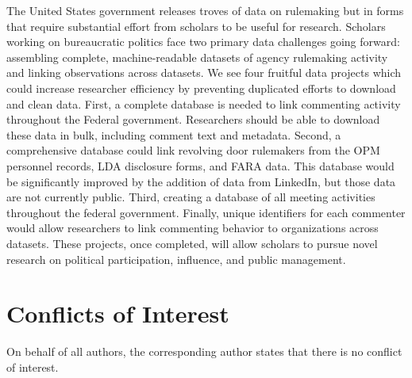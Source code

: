 \documentclass[
      12pt,
        ]{article}
\begin{document}
The United States government releases troves of data on rulemaking but
in forms that require substantial effort from scholars to be useful for
research. Scholars working on bureaucratic politics face two primary
data challenges going forward: assembling complete, machine-readable
datasets of agency rulemaking activity and linking observations across
datasets. We see four fruitful data projects which could increase
researcher efficiency by preventing duplicated efforts to download and
clean data. First, a complete database is needed to link commenting
activity throughout the Federal government. Researchers should be able
to download these data in bulk, including comment text and metadata.
Second, a comprehensive database could link revolving door rulemakers
from the OPM personnel records, LDA disclosure forms, and FARA data.
This database would be significantly improved by the addition of data
from LinkedIn, but those data are not currently public. Third, creating
a database of all meeting activities throughout the federal government.
Finally, unique identifiers for each commenter would allow researchers
to link commenting behavior to organizations across datasets. These
projects, once completed, will allow scholars to pursue novel research
on political participation, influence, and public management.

\hypertarget{conflicts-of-interest}{%
\section{Conflicts of Interest}\label{conflicts-of-interest}}

On behalf of all authors, the corresponding author states that there is
no conflict of interest.
  \newpage 
  \theendnotes
\newpage
\singlespacing 
           
  
\end{document}
